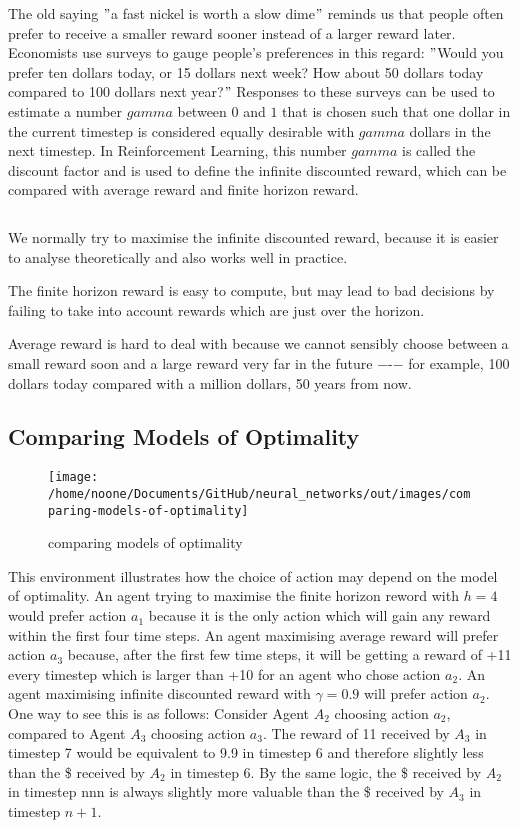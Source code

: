 \documentclass[11pt]{article}
\begin{document}
The old saying \("\)a fast nickel is worth a slow dime\("\) reminds us that people
often prefer to receive a smaller reward sooner instead of a larger reward
later.
Economists use surveys to gauge people's preferences in this regard: \("\)Would
you prefer ten dollars today, or 15 dollars next week?
How about 50 dollars today compared to 100 dollars next year?\("\) Responses
to these surveys can be used to estimate a number $gamma$ between $0$ and $1$
that is chosen such that one dollar in the current timestep is considered
equally desirable with $gamma$ dollars in the next timestep.
In Reinforcement Learning, this number $gamma$ is called the discount factor
and is used to define the infinite discounted reward, which can be compared
with average reward and finite horizon reward.

$$$$

We normally try to maximise the infinite discounted reward, because it is
easier to analyse theoretically and also works well in practice.

The finite horizon reward is easy to compute, but may lead to bad decisions by
failing to take into account rewards which are just over the horizon.

 Average reward is hard to deal with because we cannot sensibly choose between
a small reward soon and a large reward very far in the future −-− for example,
100 dollars today compared with a million dollars, 50 years from now.

\subsection{Comparing Models of Optimality}\label{subsec:comparing-models-of-optimality}
\begin{figure}[h]
    \centering
    \texttt{[image: /home/noone/Documents/GitHub/neural\_networks/out/images/comparing-models-of-optimality]}
    \caption[comparing models of optimality]{comparing models of optimality}
    \label{fig:comparing models of optimality}
\end{figure}
This environment illustrates how the choice of action may depend on the model
of optimality.
An agent trying to maximise the finite horizon reword with $h=4$ would prefer
action $a_1$ because it is the only action which will gain any reward within
the first four time steps.
An agent maximising average reward will prefer action $a_3$ because, after the
first few time steps, it will be getting a reward of +11 every timestep which
is larger than +10 for an agent who chose action $a_2$.
An agent maximising infinite discounted reward with $\gamma=0.9$ will prefer
action $a_2$.
One way to see this is as follows: Consider Agent $A_2$ choosing action $a_2$,
compared to Agent $A_3$ choosing action $a_3$.
The reward of 11 received by $A_3$ in timestep 7 would be equivalent to 9.9 in
timestep 6 and therefore slightly less than the \$ received by $A_2$ in
timestep 6.
By the same logic, the \$ received by $A_2$ in timestep nnn is always
slightly more valuable than the \$ received by $A_3$ in timestep  $n + 1$.
\end{document}
